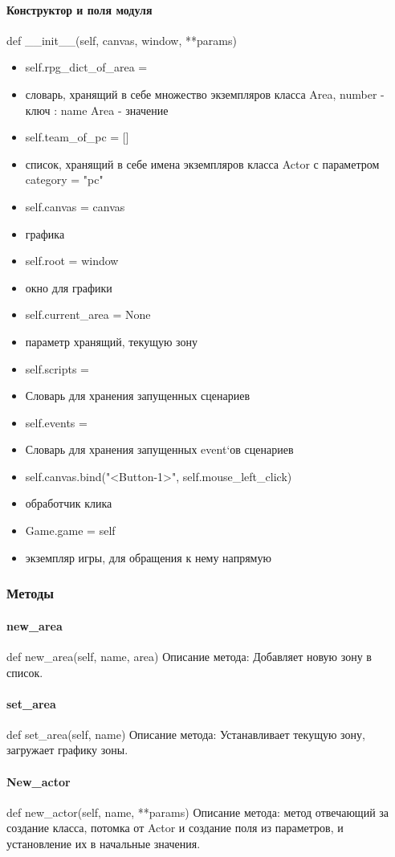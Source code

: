 \paragraph{Конструктор и поля модуля}
def \_\_init\_\_(self,  canvas, window, **params) 
\begin{itemize} 
	\item self.rpg\_dict\_of\_area = {} 
	\item словарь, хранящий в себе множество экземпляров класса Area, {number - ключ : name Area - значение}
	\item self.team\_of\_pc = [] 
	\item список, хранящий в себе имена экземпляров класса Actor с параметром category = "pc"
	\item self.canvas = canvas 
	\item графика
	\item self.root = window 
	\item окно для графики
	\item self.current\_area = None 
	\item параметр хранящий, текущую зону
	\item self.scripts = {}  
	\item Словарь для хранения запущенных сценариев
	\item self.events = {} 
	\item Словарь для хранения запущенных event`ов сценариев
	\item self.canvas.bind("<Button-1>", self.mouse\_left\_click)
	\item обработчик клика
	\item Game.game = self
	\item экземпляр игры, для обращения к нему напрямую
\end{itemize}
\subsubsection{Методы}
\paragraph{new\_area}
def new\_area(self, name, area)
Описание метода: Добавляет новую зону в список.
\paragraph{set\_area}
def set\_area(self, name)
Описание метода: Устанавливает текущую зону, загружает графику зоны.
\paragraph{New\_actor}
def new\_actor(self, name, **params)
Описание метода: метод отвечающий за создание класса, потомка от Actor и создание поля из параметров, и установление их в начальные значения.
